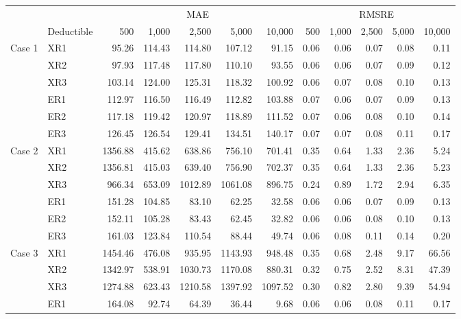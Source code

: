 \documentclass[11pt]{article}
\begin{document}
{\begin{table}[h!]
\footnotesize
\centering
\begin{tabular}{llrrrrrrrrrr}
\toprule
 & & \multicolumn{5}{c}{MAE} & \multicolumn{5}{c}{RMSRE} \\
\cmidrule(lr){3-7} \cmidrule(lr){8-12}
 & Deductible & 500 & 1,000 & 2,500 & 5,000 & 10,000 & 500 & 1,000 & 2,500 & 5,000 & 10,000 \\
\midrule
\multirow{6}{*}{Case 1} & XR1 & 95.26 & 114.43 & 114.80 & 107.12 & 91.15 & 0.06 & 0.06 & 0.07 & 0.08 & 0.11 \\
& XR2 & 97.93 & 117.48 & 117.80 & 110.10 & 93.55 & 0.06 & 0.06 & 0.07 & 0.09 & 0.12 \\
& XR3 & 103.14 & 124.00 & 125.31 & 118.32 & 100.92 & 0.06 & 0.07 & 0.08 & 0.10 & 0.13 \\
 & ER1 & 112.97 & 116.50 & 116.49 & 112.82 & 103.88 & 0.07 & 0.06 & 0.07 & 0.09 & 0.13 \\
 & ER2 & 117.18 & 119.42 & 120.97 & 118.89 & 111.52 & 0.07 & 0.06 & 0.08 & 0.10 & 0.14 \\
 & ER3 & 126.45 & 126.54 & 129.41 & 134.51 & 140.17 & 0.07 & 0.07 & 0.08 & 0.11 & 0.17 \\ 
\midrule
\multirow{6}{*}{Case 2} & XR1 & 1356.88 & 415.62 & 638.86 & 756.10 & 701.41 & 0.35 & 0.64 & 1.33 & 2.36 & 5.24 \\
& XR2 & 1356.81 & 415.03 & 639.40 & 756.90 & 702.37 & 0.35 & 0.64 & 1.33 & 2.36 & 5.23 \\
& XR3 & 966.34 & 653.09 & 1012.89 & 1061.08 & 896.75 & 0.24 & 0.89 & 1.72 & 2.94 & 6.35 \\
 & ER1 & 151.28 & 104.85 & 83.10 & 62.25 & 32.58 & 0.06 & 0.06 & 0.07 & 0.09 & 0.13 \\
 & ER2 & 152.11 & 105.28 & 83.43 & 62.45 & 32.82 & 0.06 & 0.06 & 0.08 & 0.10 & 0.13 \\
 & ER3 & 161.03 & 123.84 & 110.54 & 88.44 & 49.74 & 0.06 & 0.08 & 0.11 & 0.14 & 0.20 \\ 
\midrule
\multirow{6}{*}{Case 3} & XR1 & 1454.46 & 476.08 & 935.95 & 1143.93 & 948.48 & 0.35 & 0.68 & 2.48 & 9.17 & 66.56 \\
 & XR2 & 1342.97 & 538.91 & 1030.73 & 1170.08 & 880.31 & 0.32 & 0.75 & 2.52 & 8.31 & 47.39 \\
 & XR3 & 1274.88 & 623.43 & 1210.58 & 1397.92 & 1097.52 & 0.30 & 0.82 & 2.80 & 9.39 & 54.94 \\
 & ER1 & 164.08 & 92.74 & 64.39 & 36.44 & 9.68 & 0.06 & 0.06 & 0.08 & 0.11 & 0.17 \\

\end{tabular}
\end{table}}
\end{document}
